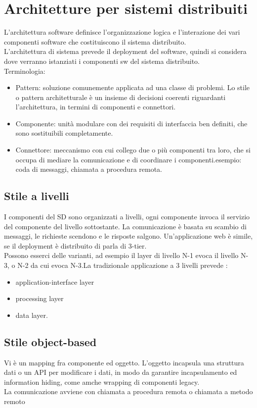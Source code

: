 \documentclass{article}
\begin{document}
\section{Architetture per sistemi distribuiti}
L'architettura software definisce l'organizzazione logica e l'interazione dei vari componenti software che costituiscono il sistema distribuito. \\L'architettura di sistema prevede il deployment del software, quindi si considera dove verranno istanziati i componenti sw del sistema distribuito.\\ Terminologia:
\begin{itemize}
\item Pattern: soluzione comunemente applicata ad una classe di problemi. Lo stile o pattern architetturale è un insieme di decisioni coerenti riguardanti l'architettura, in termini di componenti e connettori.
\item Componente: unità modulare con dei requisiti di interfaccia ben definiti, che sono sostituibili completamente.
\item Connettore: meccanismo con cui collego due o più componenti tra loro, che si occupa di mediare la comunicazione e di coordinare i componenti.esempio: coda di messaggi, chiamata a procedura remota.
\end{itemize}
\subsection{Stile a livelli}
I componenti del SD sono organizzati a livelli, ogni componente invoca il servizio del componente del livello sottostante. La comunicazione è basata su scambio di messaggi, le richieste scendono e le risposte salgono. Un'applicazione web è simile, se il deployment è distribuito di parla di 3-tier.\\ Possono esserci delle varianti, ad esempio il layer di livello N-1 evoca il livello N-3, o N-2
da cui evoca N-3.La tradizionale applicazione a 3 livelli prevede :
\begin{itemize}
\item application-interface layer
\item processing layer
\item data layer.
\end{itemize}
\subsection{Stile object-based}
Vi è un mapping fra componente ed oggetto. L'oggetto incapsula una struttura dati o un API per modificare i dati, in modo da garantire incapsulamento ed information hiding, come amche wrapping di componenti legacy.\\ La comunicazione avviene con chiamata a procedura remota o chiamata a metodo remoto
\end{document}
